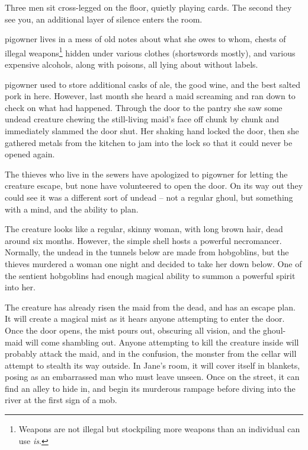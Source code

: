 \begin{multicols}{2}
\begin{boxtext}
	Three men sit cross-legged on the floor, quietly playing cards.
	The second they see you, an additional layer of silence enters the room.
\end{boxtext}



\Gls{pigowner} lives in a mess of old notes about what she owes to whom, chests of illegal weapons\footnote{Weapons are not illegal but stockpiling more weapons than an individual can use \emph{is}.} hidden under various clothes (shortswords mostly), and various expensive alcohols, along with poisons, all lying about without labels.

\label{pig_pantry}

\Gls{pigowner} used to store additional casks of ale, the good wine, and the best salted pork in here.  However, last month she heard a maid screaming and ran down to check on what had happened.  Through the door to the pantry she saw some undead creature chewing the still-living maid's face off chunk by chunk and immediately slammed the door shut.  Her shaking hand locked the door, then she gathered metals from the kitchen to jam into the lock so that it could never be opened again.

The thieves who live in the sewers have apologized to \gls{pigowner} for letting the creature escape, but none have volunteered to open the door.
On its way out they could see it was a different sort of undead -- not a regular ghoul, but something with a mind, and the ability to plan.

The creature looks like a regular, skinny woman, with long brown hair, dead around six months.  However, the simple shell hosts a powerful necromancer.  Normally, the undead in the tunnels below are made from hobgoblins, but the thieves murdered a woman one night and decided to take her down below.  One of the sentient hobgoblins had enough magical ability to summon a powerful spirit into her.



The creature has already risen the maid from the dead, and has an escape plan.
It will create a magical mist as it hears anyone attempting to enter the door.
Once the door opens, the mist pours out, obscuring all vision, and the ghoul-maid will come shambling out.
Anyone attempting to kill the creature inside will probably attack the maid, and in the confusion, the monster from the cellar will attempt to stealth its way outside.
In Jane's room, it will cover itself in blankets, posing as an embarrassed man who must leave unseen.
Once on the street, it can find an alley to hide in, and begin its murderous rampage before diving into the river at the first sign of a mob.


\end{multicols}
